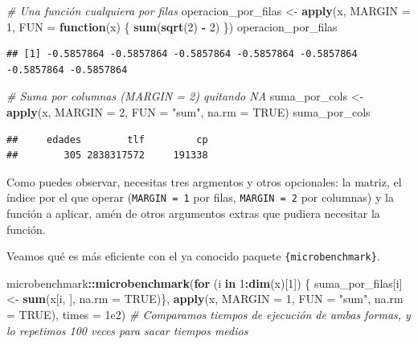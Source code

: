 \documentclass[11pt,]{book}
\newenvironment{Shaded}{\begin{snugshade}}{\end{snugshade}}
\newcommand{\CommentTok}[1]{\textcolor[rgb]{0.37,0.37,0.37}{\textit{#1}}}
\newcommand{\ControlFlowTok}[1]{\textcolor[rgb]{0.27,0.27,0.27}{\textbf{#1}}}
\newcommand{\DataTypeTok}[1]{\textcolor[rgb]{0.27,0.27,0.27}{#1}}
\newcommand{\DecValTok}[1]{\textcolor[rgb]{0.06,0.06,0.06}{#1}}
\newcommand{\FloatTok}[1]{\textcolor[rgb]{0.06,0.06,0.06}{#1}}
\newcommand{\KeywordTok}[1]{\textcolor[rgb]{0.27,0.27,0.27}{\textbf{#1}}}
\newcommand{\NormalTok}[1]{#1}
\newcommand{\OperatorTok}[1]{\textcolor[rgb]{0.43,0.43,0.43}{\textbf{#1}}}
\newcommand{\OtherTok}[1]{\textcolor[rgb]{0.37,0.37,0.37}{#1}}
\newcommand{\StringTok}[1]{\textcolor[rgb]{0.5,0.5,0.5}{#1}}
\begin{document}
\begin{Shaded}
\begin{Highlighting}[]
\CommentTok{# Una función cualquiera por filas}
\NormalTok{operacion_por_filas <-}\StringTok{ }\KeywordTok{apply}\NormalTok{(x, }\DataTypeTok{MARGIN =} \DecValTok{1}\NormalTok{, }\DataTypeTok{FUN =} \ControlFlowTok{function}\NormalTok{(x) \{ }\KeywordTok{sum}\NormalTok{(}\KeywordTok{sqrt}\NormalTok{(}\DecValTok{2}\NormalTok{) }\OperatorTok{-}\StringTok{ }\DecValTok{2}\NormalTok{) \})}
\NormalTok{operacion_por_filas}
\end{Highlighting}
\end{Shaded}

\begin{verbatim}
## [1] -0.5857864 -0.5857864 -0.5857864 -0.5857864 -0.5857864 -0.5857864 -0.5857864
\end{verbatim}

\begin{Shaded}
\begin{Highlighting}[]
\CommentTok{# Suma por columnas (MARGIN = 2) quitando NA}
\NormalTok{suma_por_cols <-}\StringTok{ }\KeywordTok{apply}\NormalTok{(x, }\DataTypeTok{MARGIN =} \DecValTok{2}\NormalTok{, }\DataTypeTok{FUN =} \StringTok{"sum"}\NormalTok{, }\DataTypeTok{na.rm =} \OtherTok{TRUE}\NormalTok{)}
\NormalTok{suma_por_cols}
\end{Highlighting}
\end{Shaded}

\begin{verbatim}
##     edades        tlf         cp 
##        305 2838317572     191338
\end{verbatim}

Como puedes observar, necesitas tres argmentos y otros opcionales: la matriz, el índice por el que operar (\texttt{MARGIN\ =\ 1} por filas, \texttt{MARGIN\ =\ 2} por columnas) y la función a aplicar, amén de otros argumentos extras que pudiera necesitar la función.

Veamos qué es más eficiente con el ya conocido paquete \texttt{\{microbenchmark\}}.

\begin{Shaded}
\begin{Highlighting}[]
\NormalTok{microbenchmark}\OperatorTok{::}\KeywordTok{microbenchmark}\NormalTok{(}\ControlFlowTok{for}\NormalTok{ (i }\ControlFlowTok{in} \DecValTok{1}\OperatorTok{:}\KeywordTok{dim}\NormalTok{(x)[}\DecValTok{1}\NormalTok{]) \{}
\NormalTok{  suma_por_filas[i] <-}\StringTok{ }\KeywordTok{sum}\NormalTok{(x[i, ], }\DataTypeTok{na.rm =} \OtherTok{TRUE}\NormalTok{)\}, }\KeywordTok{apply}\NormalTok{(x, }\DataTypeTok{MARGIN =} \DecValTok{1}\NormalTok{, }\DataTypeTok{FUN =} \StringTok{"sum"}\NormalTok{, }\DataTypeTok{na.rm =} \OtherTok{TRUE}\NormalTok{), }\DataTypeTok{times =} \FloatTok{1e2}\NormalTok{) }\CommentTok{# Comparamos tiempos de ejecución de ambas formas, y lo repetimos 100 veces para sacar tiempos medios}
\end{Highlighting}
\end{Shaded}
\end{document}
